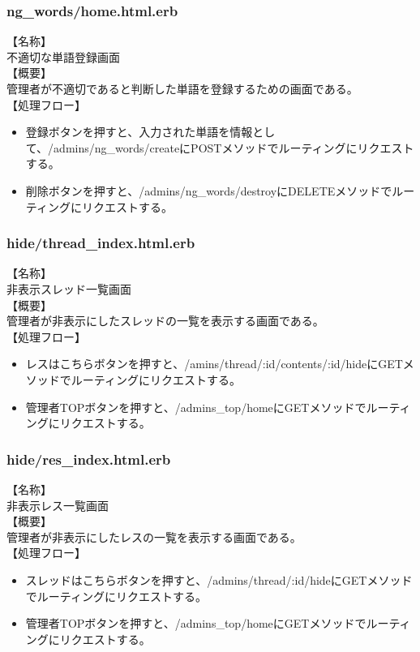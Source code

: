 \documentclass[a4j]{jarticle}
\begin{document}
\subsubsection{ng\_words/home.html.erb}
\noindent
【名称】\\
不適切な単語登録画面\\
【概要】\\
管理者が不適切であると判断した単語を登録するための画面である。\\
【処理フロー】
\begin{itemize}
  \item 登録ボタンを押すと、入力された単語を情報として、/admins/ng\_words/createにPOSTメソッドでルーティングにリクエストする。
  \item 削除ボタンを押すと、/admins/ng\_words/destroyにDELETEメソッドでルーティングにリクエストする。
\end{itemize}

\subsubsection{hide/thread\_index.html.erb}
\noindent
【名称】\\
非表示スレッド一覧画面\\
【概要】\\
管理者が非表示にしたスレッドの一覧を表示する画面である。\\
【処理フロー】
\begin{itemize}
  \item レスはこちらボタンを押すと、/amins/thread/:id/contents/:id/hideにGETメソッドでルーティングにリクエストする。
  \item 管理者TOPボタンを押すと、/admins\_top/homeにGETメソッドでルーティングにリクエストする。
\end{itemize}

\subsubsection{hide/res\_index.html.erb}
\noindent
【名称】\\
非表示レス一覧画面\\
【概要】\\
管理者が非表示にしたレスの一覧を表示する画面である。\\
【処理フロー】
\begin{itemize}
  \item スレッドはこちらボタンを押すと、/admins/thread/:id/hideにGETメソッドでルーティングにリクエストする。
  \item 管理者TOPボタンを押すと、/admins\_top/homeにGETメソッドでルーティングにリクエストする。
\end{itemize}
\end{document}
